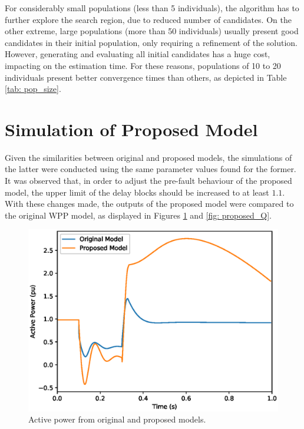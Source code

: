 For considerably small populations (less than 5 individuals), the algorithm has to further explore the search region, due to reduced number of candidates. On the other extreme, large populations (more than 50 individuals) usually present good candidates in their initial population, only requiring a refinement of the solution. However, generating and evaluating all initial candidates has a huge cost, impacting on the estimation time. For these reasons, populations of 10 to 20 individuals present better convergence times than others, as depicted in Table \ref{tab: pop_size}.

\section{Simulation of Proposed Model}

Given the similarities between original and proposed models, the simulations of the latter were conducted using the same parameter values found for the former. It was observed that, in order to adjust the pre-fault behaviour of the proposed model, the upper limit of the delay blocks should be increased to at least $1.1$. With these changes made, the outputs of the proposed model were compared to the original WPP model, as displayed in Figures \ref{fig: proposed_P} and \ref{fig: proposed_Q}.

\begin{figure}[!h]
	\centering
	\includegraphics[scale=.7]{Images/P_proposed.eps}
	\caption{Active power from original and proposed models.}
	\label{fig: proposed_P}
\end{figure}

